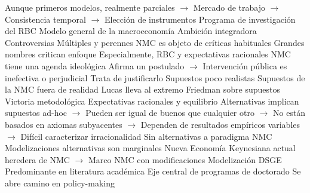 \documentclass{nuevotema}
\begin{document}
\begin{esquemal}
				\4[] Aunque primeros modelos, realmente parciales
				\4[] $\to$ Mercado de trabajo
				\4[] $\to$ Consistencia temporal
				\4[] $\to$ Elección de instrumentos
				\4 Programa de investigación del RBC
				\4[] Modelo general de la macroeconomía
				\4[] Ambición integradora
			\3 Controversias
				\4 Múltiples y perennes
				\4[] NMC es objeto de críticas habituales
				\4[] Grandes nombres critican enfoque
				\4[] Especialmente, RBC y expectativas racionales
				\4 NMC tiene una agenda ideológica
				\4[] Afirma un postulado
				\4[] $\to$ Intervención pública es inefectiva o perjudicial
				\4[] Trata de justificarlo
				\4 Supuestos poco realistas
				\4[] Supuestos de la NMC fuera de realidad
				\4[] Lucas lleva al extremo Friedman sobre supuestos
			\3 Victoria metodológica
				\4 Expectativas racionales y equilibrio
				\4[] Alternativas implican supuestos ad-hoc
				\4[] $\to$ Pueden ser igual de buenos que cualquier otro
				\4[] $\to$ No están basados en axiomas subyacentes
				\4[] $\to$ Dependen de resultados empíricos variables
				\4[] $\to$ Difícil caracterizar irracionalidad
				\4 Sin alternativas a paradigma NMC
				\4[] Modelizaciones alternativas son marginales
				\4[] Nueva Economía Keynesiana actual heredera de NMC
				\4[] $\to$ Marco NMC con modificaciones
				\4 Modelización DSGE
				\4[] Predominante en literatura académica
				\4[] Eje central de programas de doctorado
				\4[] Se abre camino en policy-making
\end{esquemal}
\end{document}
